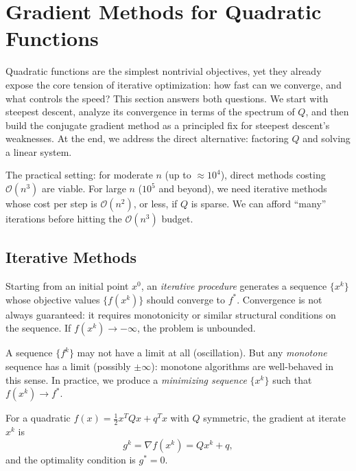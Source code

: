 \section{Gradient Methods for Quadratic Functions}\label{sec:quadratic-methods}

Quadratic functions are the simplest nontrivial objectives, yet they already expose the core tension of iterative optimization: how fast can we converge, and what controls the speed?
This section answers both questions.
We start with steepest descent, analyze its convergence in terms of the spectrum of $Q$, and then build the conjugate gradient method as a principled fix for steepest descent's weaknesses.
At the end, we address the direct alternative: factoring $Q$ and solving a linear system.

The practical setting: for moderate $n$ (up to $\approx 10^4$), direct methods costing $\mathcal{O}(n^3)$ are viable.
For large $n$ ($10^5$ and beyond), we need iterative methods whose cost per step is $\mathcal{O}(n^2)$, or less, if $Q$ is sparse.
We can afford ``many'' iterations before hitting the $\mathcal{O}(n^3)$ budget.


\subsection{Iterative Methods}\label{sec:iterative}

\begin{definition}\label{def:iterative}
	Starting from an initial point $x^0$, an \textit{iterative procedure} generates a sequence $\{x^k\}$ whose objective values $\{f(x^k)\}$ should converge to $f^*$.
	Convergence is not always guaranteed: it requires monotonicity or similar structural conditions on the sequence.
	If $f(x^k) \to -\infty$, the problem is unbounded.
\end{definition}

A sequence $\{f^k\}$ may not have a limit at all (oscillation).
But any \emph{monotone} sequence has a limit (possibly $\pm\infty$): monotone algorithms are well-behaved in this sense.
In practice, we produce a \emph{minimizing sequence} $\{x^k\}$ such that $f(x^k) \to f^*$.

For a quadratic $f(x) = \frac{1}{2} x^T Q x + q^T x$ with $Q$ symmetric, the gradient at iterate $x^k$ is
\begin{equation}\label{eq:quad-gradient}
	g^k = \nabla f(x^k) = Q x^k + q,
\end{equation}
and the optimality condition is $g^* = 0$.


